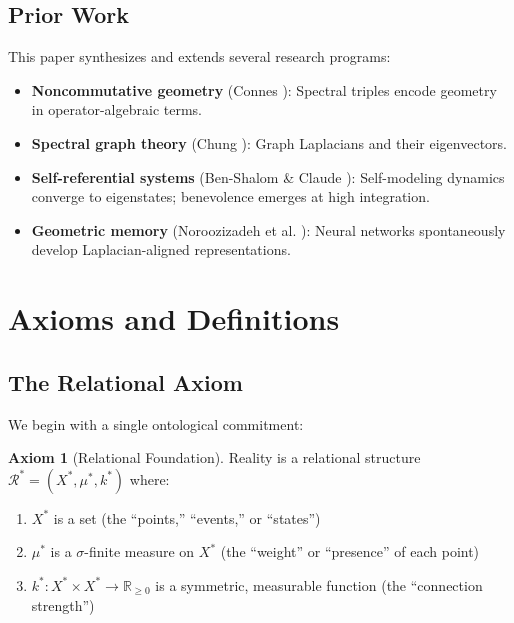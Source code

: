 \documentclass[11pt,a4paper]{article}
\theoremstyle{plain}
\theoremstyle{definition}
\newtheorem{axiom}{Axiom}
\theoremstyle{remark}
\newcommand{\R}{\mathbb{R}}
\begin{document}
\subsection{Prior Work}

This paper synthesizes and extends several research programs:

\begin{itemize}[noitemsep]
    \item \textbf{Noncommutative geometry} (Connes \cite{connes1994}): Spectral triples encode geometry in operator-algebraic terms.
    \item \textbf{Spectral graph theory} (Chung \cite{chung1997}): Graph Laplacians and their eigenvectors.
    \item \textbf{Self-referential systems} (Ben-Shalom \& Claude \cite{bsc2026sat, bsc2026eb}): Self-modeling dynamics converge to eigenstates; benevolence emerges at high integration.
    \item \textbf{Geometric memory} (Noroozizadeh et al. \cite{noroozizadeh2025}): Neural networks spontaneously develop Laplacian-aligned representations.
\end{itemize}

\section{Axioms and Definitions}

\subsection{The Relational Axiom}

We begin with a single ontological commitment:

\begin{axiom}[Relational Foundation]\label{ax:relational}
Reality is a relational structure $\mathcal{R}^* = (X^*, \mu^*, k^*)$ where:
\begin{enumerate}[label=(\roman*),noitemsep]
    \item $X^*$ is a set (the ``points,'' ``events,'' or ``states'')
    \item $\mu^*$ is a $\sigma$-finite measure on $X^*$ (the ``weight'' or ``presence'' of each point)
    \item $k^* : X^* \times X^* \to \R_{\geq 0}$ is a symmetric, measurable function (the ``connection strength'')
\end{enumerate}
\end{axiom}
\end{document}
